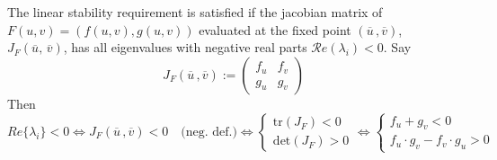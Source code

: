  The linear stability requirement is satisfied if the jacobian matrix of $F(u,v) = (f(u,v), g(u,v))$ evaluated at the fixed point $(\overline{u}\,, \overline{v})$, $J_F(\overline{u},\, \overline{v})$, has all eigenvalues with negative real parts $\mathcal{R}e(\lambda_i)<0$. Say 
 \begin{equation*}
 		J_{F}(\overline{u}\,, \overline{v}) := \begin{pmatrix}
 			f_u & f_v \\
 			g_u & g_v
 		\end{pmatrix}
 \end{equation*}
Then
$$
Re\{\lambda_i\} <0 \iff 	J_{F}(\overline{u}\,, \overline{v})< 0\quad  \text{(neg. def.)} \iff \begin{cases}
		\text{tr}(J_F) < 0 \\
		\text{det}(J_F)>0
	\end{cases}
	\iff \begin{cases}
		f_u + g_v < 0 \\
		f_u\cdot g_v - f_v\cdot g_u>0
	\end{cases}
$$




\citep{murray}


\newpage